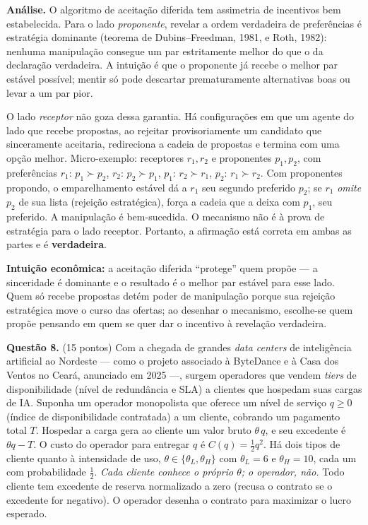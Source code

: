 \begin{solucao}
\textbf{Análise.} O algoritmo de aceitação diferida tem assimetria de incentivos bem estabelecida. Para o lado \emph{proponente}, revelar a ordem verdadeira de preferências é estratégia dominante (teorema de Dubins--Freedman, 1981, e Roth, 1982): nenhuma manipulação consegue um par estritamente melhor do que o da declaração verdadeira. A intuição é que o proponente já recebe o melhor par estável possível; mentir só pode descartar prematuramente alternativas boas ou levar a um par pior.

O lado \emph{receptor} não goza dessa garantia. Há configurações em que um agente do lado que recebe propostas, ao rejeitar provisoriamente um candidato que sinceramente aceitaria, redireciona a cadeia de propostas e termina com uma opção melhor. Micro-exemplo: receptores $r_1,r_2$ e proponentes $p_1,p_2$, com preferências $r_1:\,p_1\succ p_2$, $r_2:\,p_2\succ p_1$, $p_1:\,r_2\succ r_1$, $p_2:\,r_1\succ r_2$. Com proponentes propondo, o emparelhamento estável dá a $r_1$ seu segundo preferido $p_2$; se $r_1$ \emph{omite} $p_2$ de sua lista (rejeição estratégica), força a cadeia que a deixa com $p_1$, seu preferido. A manipulação é bem-sucedida. O mecanismo não é à prova de estratégia para o lado receptor. Portanto, a afirmação está correta em ambas as partes e é \textbf{verdadeira}.

\textbf{Intuição econômica:} a aceitação diferida ``protege'' quem propõe --- a sinceridade é dominante e o resultado é o melhor par estável para esse lado. Quem só recebe propostas detém poder de manipulação porque sua rejeição estratégica move o curso das ofertas; ao desenhar o mecanismo, escolhe-se quem propõe pensando em quem se quer dar o incentivo à revelação verdadeira.
\end{solucao}


\textbf{Questão 8.} (15 pontos) Com a chegada de grandes \emph{data centers} de inteligência artificial ao Nordeste --- como o projeto associado à ByteDance e à Casa dos Ventos no Ceará, anunciado em 2025 ---, surgem operadores que vendem \emph{tiers} de disponibilidade (nível de redundância e SLA) a clientes que hospedam suas cargas de IA. Suponha um operador monopolista que oferece um nível de serviço $q\ge 0$ (índice de disponibilidade contratada) a um cliente, cobrando um pagamento total $T$. Hospedar a carga gera ao cliente um valor bruto $\theta\,q$, e seu excedente é $\theta q - T$. O custo do operador para entregar $q$ é $C(q)=\tfrac{1}{2}q^2$. Há dois tipos de cliente quanto à intensidade de uso, $\theta\in\{\theta_L,\theta_H\}$ com $\theta_L=6$ e $\theta_H=10$, cada um com probabilidade $\tfrac{1}{2}$. \emph{Cada cliente conhece o próprio $\theta$; o operador, não.} Todo cliente tem excedente de reserva normalizado a zero (recusa o contrato se o excedente for negativo). O operador desenha o contrato para maximizar o lucro esperado.

